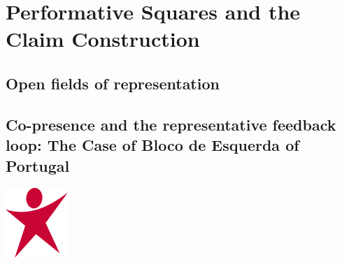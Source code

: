 \chapter{Performative Squares and the Claim Construction}\label{chap:Performative Squares and the Claim Construction} %

\section{Open fields of representation}\label{sec:Open fields of representation} %

\section{Co-presence and the representative feedback loop: The Case of Bloco de Esquerda of Portugal}\label{sec:Co-presence and the representative feedback loop: The Case of Left Bloc} %
\begin{marginfigure}
	\includegraphics{LeftBloc.svg.png}

\end{marginfigure}

